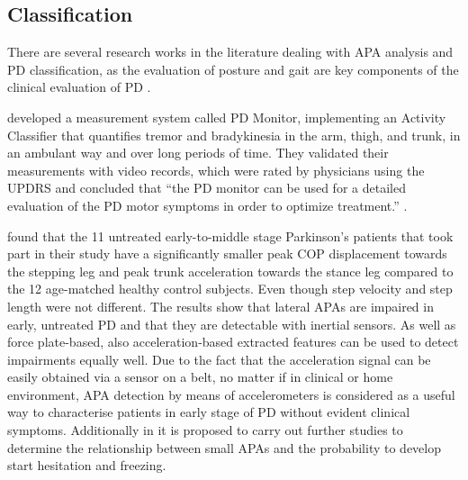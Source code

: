 \subsection{Classification}

There are several research works in the literature dealing with APA analysis and PD classification, as the evaluation of posture and gait are key components of the clinical evaluation of PD \cite{palmerini_classification_2013}.

\citeauthor{klerk_long-term_2009} \cite{klerk_long-term_2009} developed a measurement system called PD Monitor, implementing an Activity Classifier that quantifies tremor and bradykinesia in the arm, thigh, and trunk, in an ambulant way and over long periods of time. They validated their measurements with video records, which were rated by physicians using the UPDRS and concluded that ``the PD monitor can be used for a detailed evaluation of the PD motor symptoms in order to optimize treatment.'' \cite{klerk_long-term_2009}.

\citeauthor{mancini_anticipatory_2009} \cite{mancini_anticipatory_2009} found that the 11 untreated early-to-middle stage Parkinson's patients that took part in their study have a significantly smaller peak COP displacement towards the stepping leg and peak trunk acceleration towards the stance leg compared to the 12 age-matched healthy control subjects. Even though step velocity and step length were not different. The results show that lateral APAs are impaired in early, untreated PD and that they are detectable with inertial sensors. As well as force plate-based, also acceleration-based extracted features can be used to detect impairments equally well. Due to the fact that the acceleration signal can be easily obtained via a sensor on a belt, no matter if in clinical or home environment, APA detection by means of accelerometers is considered as a useful way to characterise patients in early stage of PD without evident clinical symptoms. Additionally in \cite{mancini_anticipatory_2009} it is proposed to carry out further studies to determine the relationship between small APAs and the probability to develop start hesitation and freezing.

